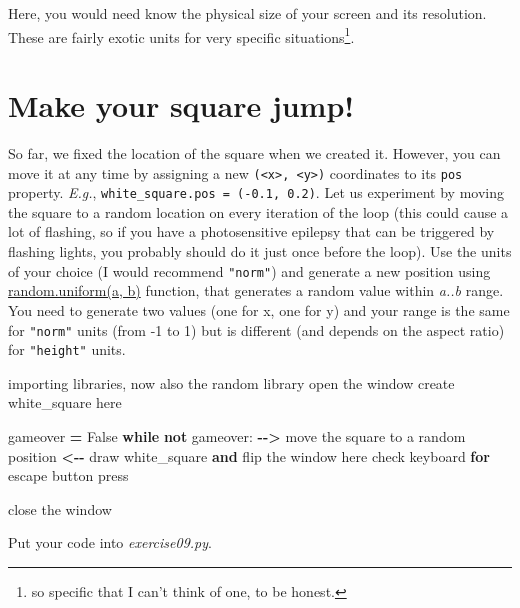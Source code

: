\documentclass[
]{book}
\newenvironment{Shaded}{\begin{snugshade}}{\end{snugshade}}
\newcommand{\BuiltInTok}[1]{#1}
\newcommand{\ControlFlowTok}[1]{\textcolor[rgb]{0.13,0.29,0.53}{\textbf{#1}}}
\newcommand{\KeywordTok}[1]{\textcolor[rgb]{0.13,0.29,0.53}{\textbf{#1}}}
\newcommand{\NormalTok}[1]{#1}
\newcommand{\OperatorTok}[1]{\textcolor[rgb]{0.81,0.36,0.00}{\textbf{#1}}}
\newcommand{\VariableTok}[1]{\textcolor[rgb]{0.00,0.00,0.00}{#1}}
\begin{document}
Here, you would need know the physical size of your screen and its resolution. These are fairly exotic units for very specific situations\footnote{so specific that I can't think of one, to be honest.}.

\hypertarget{make-your-square-jump}{%
\section{Make your square jump!}\label{make-your-square-jump}}

So far, we fixed the location of the square when we created it. However, you can move it at any time by assigning a new \texttt{(\textless{}x\textgreater{},\ \textless{}y\textgreater{})} coordinates to its \texttt{pos} property. \emph{E.g.}, \texttt{white\_square.pos\ =\ (-0.1,\ 0.2)}. Let us experiment by moving the square to a random location on every iteration of the loop (this could cause a lot of flashing, so if you have a photosensitive epilepsy that can be triggered by flashing lights, you probably should do it just once before the loop). Use the units of your choice (I would recommend \texttt{"norm"}) and generate a new position using \href{https://docs.python.org/3/library/random.html\#random.uniform}{random.uniform(a, b)} function, that generates a random value within \emph{a..b} range. You need to generate two values (one for x, one for y) and your range is the same for \texttt{"norm"} units (from -1 to 1) but is different (and depends on the aspect ratio) for \texttt{"height"} units.

\begin{Shaded}
\begin{Highlighting}[]
\NormalTok{importing libraries, now also the random library}
\BuiltInTok{open}\NormalTok{ the window}
\NormalTok{create white\_square here}

\NormalTok{gameover }\OperatorTok{=} \VariableTok{False}
\ControlFlowTok{while} \KeywordTok{not}\NormalTok{ gameover:}
    \OperatorTok{{-}{-}\textgreater{}}\NormalTok{ move the square to a random position }\OperatorTok{\textless{}{-}{-}}
\NormalTok{    draw white\_square }\KeywordTok{and}\NormalTok{ flip the window here}
\NormalTok{    check keyboard }\ControlFlowTok{for}\NormalTok{ escape button press}

\NormalTok{close the window}
\end{Highlighting}
\end{Shaded}

Put your code into \emph{exercise09.py}.
\end{document}
